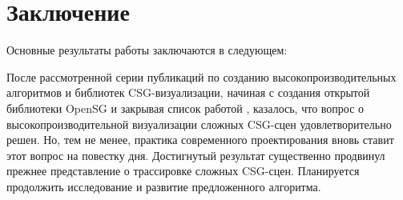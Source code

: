 \chapter*{Заключение}						%

Основные результаты работы заключаются в следующем:



После рассмотренной серии публикаций по созданию высокопроизводительных алгоритмов и библиотек CSG-визуализации, начиная с создания открытой библиотеки OpenSG  и закрывая список работой \todo{[7]}, казалось, что вопрос о высокопроизводительной визуализации сложных CSG-сцен удовлетворительно решен. Но, тем не менее, практика современного проектирования вновь ставит этот вопрос на повестку дня. Достигнутый результат существенно продвинул прежнее представление о трассировке сложных CSG-сцен. Планируется продолжить исследование и развитие предложенного алгоритма.
